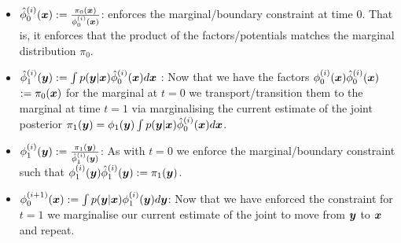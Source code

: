 \documentclass[a4paper,12pt,twoside,openright]{report}
\theoremstyle{definition}
\begin{document}
\begin{itemize}
    \item ${\hat{\phi}}_0^{(i)}({\bm{x}}) := \frac{\pi_0({\bm{x}})}{\phi_0^{(i)}({\bm{x}})}$: enforces the marginal/boundary constraint at time $0$. That is, it enforces that the product of the factors/potentials matches the marginal distribution $\pi_0$.
    \item ${\hat{\phi}}_1^{(i)}({\bm{y}}) := \int  p({\bm{y}} | {\bm{x}}) {\hat{\phi}}_0^{(i)}({\bm{x}}) d{\bm{x}}$ : Now that we have the factors $\phi_0^{(i)}({\bm{x}}) {\hat{\phi}}_0^{(i)}({\bm{x}}) $ $:= {\pi_0({\bm{x}})}$ for the marginal at $t=0$ we transport/transition them to the marginal at time $t=1$ via marginalising the current estimate of the joint posterior $\pi_1({\bm{y}}) = \phi_1({\bm{y}}) \int p({\bm{y}}| {\bm{x}}) {\hat{\phi}}_0^{(i)}({\bm{x}}) d{\bm{x}}$.
    \item  $\phi_1^{(i)}({\bm{y}}) := \frac{\pi_1({\bm{y}})}{{\hat{\phi}}_1^{(i)}({\bm{y}})}$: As with $t=0$ we enforce the marginal/boundary  constraint such that  $\phi_1^{(i)}({\bm{y}}) {\hat{\phi}}_1^{(i)}({\bm{y}}) := {\pi_1({\bm{y}})}$. 
    \item $\phi^{(i+1)}_0({\bm{x}}) := \int  p({\bm{y}} | {\bm{x}}) \phi_1^{(i)}({\bm{y}}) d{\bm{y}}$: Now that we have enforced the constraint for $t=1$ we marginalise our current estimate of the joint to move from ${\bm{y}}$ to ${\bm{x}}$ and repeat.
\end{itemize}
\end{document}
